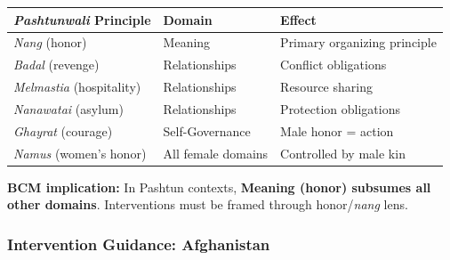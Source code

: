 \begin{center}
\begin{tabular}{@{}llp{5cm}@{}}
\toprule
\textbf{\textit{Pashtunwali} Principle} & \textbf{Domain} & \textbf{Effect} \\
\midrule
\textit{Nang} (honor) & Meaning & Primary organizing principle \\
\textit{Badal} (revenge) & Relationships & Conflict obligations \\
\textit{Melmastia} (hospitality) & Relationships & Resource sharing \\
\textit{Nanawatai} (asylum) & Relationships & Protection obligations \\
\textit{Ghayrat} (courage) & Self-Governance & Male honor = action \\
\textit{Namus} (women's honor) & All female domains & Controlled by male kin \\
\bottomrule
\end{tabular}
\end{center}

\textbf{BCM implication:} In Pashtun contexts, \textbf{Meaning (honor) subsumes all other domains}. Interventions must be framed through honor/\textit{nang} lens.

\subsubsection{Intervention Guidance: Afghanistan}

